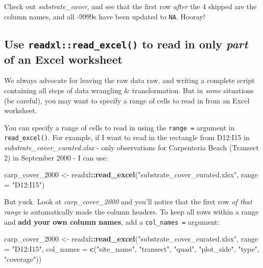 \documentclass[]{book}
\newenvironment{Shaded}{\begin{snugshade}}{\end{snugshade}}
\newcommand{\DataTypeTok}[1]{\textcolor[rgb]{0.13,0.29,0.53}{#1}}
\newcommand{\DecValTok}[1]{\textcolor[rgb]{0.00,0.00,0.81}{#1}}
\newcommand{\KeywordTok}[1]{\textcolor[rgb]{0.13,0.29,0.53}{\textbf{#1}}}
\newcommand{\NormalTok}[1]{#1}
\newcommand{\OperatorTok}[1]{\textcolor[rgb]{0.81,0.36,0.00}{\textbf{#1}}}
\newcommand{\StringTok}[1]{\textcolor[rgb]{0.31,0.60,0.02}{#1}}
\begin{document}
Check out \emph{substrate\_cover}, and see that the first row \emph{after} the 4 skipped are the column names, and all -9999s have been updated to \texttt{NA}. Hooray!

\hypertarget{use-readxlread_excel-to-read-in-only-part-of-an-excel-worksheet}{%
\subsection{\texorpdfstring{Use \texttt{readxl::read\_excel()} to read in only \emph{part} of an Excel worksheet}{Use readxl::read\_excel() to read in only part of an Excel worksheet}}\label{use-readxlread_excel-to-read-in-only-part-of-an-excel-worksheet}}

We always advocate for leaving the raw data raw, and writing a complete script containing all steps of data wrangling \& transformation. But in \emph{some} situations (be careful), you may want to specify a range of cells to read in from an Excel worksheet.

You can specify a range of cells to read in using the \texttt{range\ =} argument in \texttt{read\_excel()}. For example, if I want to read in the rectangle from D12:I15 in \emph{substrate\_cover\_curated.xlsx} - only observations for Carpenteria Beach (Transect 2) in September 2000 - I can use:

\begin{Shaded}
\begin{Highlighting}[]
\NormalTok{carp_cover_}\DecValTok{2000}\NormalTok{ <-}\StringTok{ }\NormalTok{readxl}\OperatorTok{::}\KeywordTok{read_excel}\NormalTok{(}\StringTok{"substrate_cover_curated.xlsx"}\NormalTok{, }\DataTypeTok{range =} \StringTok{"D12:I15"}\NormalTok{)}
\end{Highlighting}
\end{Shaded}

But yuck. Look at \emph{carp\_cover\_2000} and you'll notice that the first row \emph{of that range} is automatically made the column headers. To keep all rows within a range and \textbf{add your own column names}, add a \texttt{col\_names\ =} argument:

\begin{Shaded}
\begin{Highlighting}[]
\NormalTok{carp_cover_}\DecValTok{2000}\NormalTok{ <-}\StringTok{ }\NormalTok{readxl}\OperatorTok{::}\KeywordTok{read_excel}\NormalTok{(}\StringTok{"substrate_cover_curated.xlsx"}\NormalTok{, }\DataTypeTok{range =} \StringTok{"D12:I15"}\NormalTok{, }\DataTypeTok{col_names =} \KeywordTok{c}\NormalTok{(}\StringTok{"site_name"}\NormalTok{, }\StringTok{"transect"}\NormalTok{, }\StringTok{"quad"}\NormalTok{, }\StringTok{"plot_side"}\NormalTok{, }\StringTok{"type"}\NormalTok{, }\StringTok{"coverage"}\NormalTok{))}
\end{Highlighting}
\end{Shaded}
\end{document}

